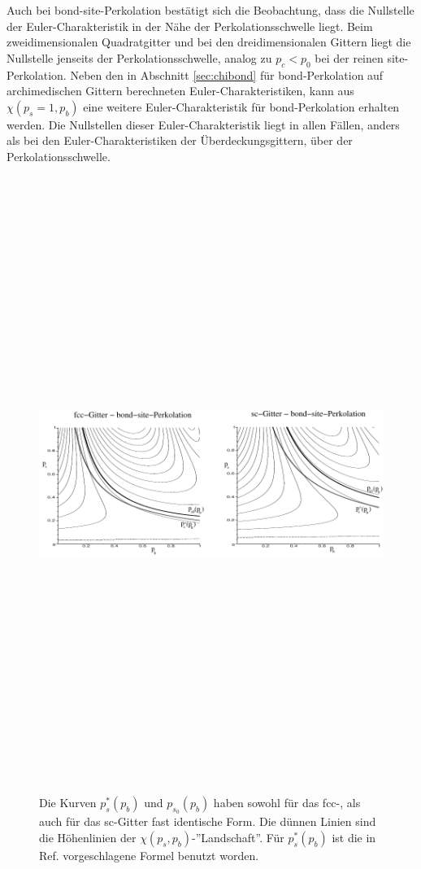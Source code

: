 Auch bei bond-site-Perkolation best\"atigt sich die Beobachtung, dass die Nullstelle der Euler-Charakteristik in der N\"ahe der Perkolationsschwelle liegt. Beim zweidimensionalen Quadratgitter und bei den dreidimensionalen Gittern liegt die Nullstelle jenseits der Perkolationsschwelle, analog zu $p_c<p_0$ bei der reinen site-Perkolation. Neben den in Abschnitt \ref{sec:chibond} f\"ur bond-Perkolation auf archimedischen Gittern berechneten Euler-Charakteristiken, kann aus $\chi(p_s=1,p_b)$ eine weitere Euler-Charakteristik f\"ur bond-Perkolation erhalten werden. Die Nullstellen dieser Euler-Charakteristik liegt in allen F\"allen, anders als bei den Euler-Charakteristiken der \"Uberdeckungsgittern, \"uber der Perkolationsschwelle.

\begin{figure}[htbp]
  \centering
  \includegraphics[height=20cm]{./Schranken-figs/bond-site3d}
  \caption{Die Kurven $p_s^*(p_b)$ und $p_{s_0}(p_b)$ haben sowohl f\"ur das fcc-, als auch f\"ur das sc-Gitter fast identische Form. Die d\"unnen Linien sind die H\"ohenlinien der $\chi(p_s,p_b)$-''Landschaft''. F\"ur $p_s^*(p_b)$ ist die in Ref. \cite{Yanuka:90} vorgeschlagene Formel benutzt worden.}
  \label{fig:bond-site3d}
\end{figure}